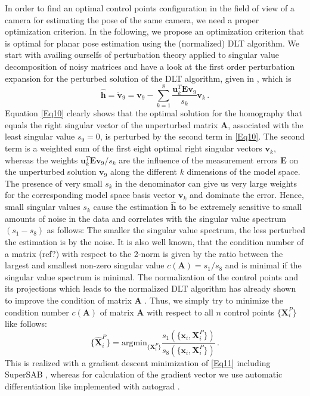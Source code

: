 \documentclass[letterpaper, 10 pt, conference]{ieeeconf}  %
\begin{document}
	In order to find an optimal control points configuration in the field of view of a camera for estimating the pose of the same camera, we need a proper optimization criterion. 
	In the following, we propose an optimization criterion that is optimal for planar pose estimation using the (normalized) DLT algorithm.
	We start with availing ourselfs of perturbation theory applied to singular value decomposition of noisy matrices \cite{Stewart1998} and have a look at the first order perturbation expansion for the
	perturbed solution of the DLT algorithm, given in \cite{Chen2009}, which is 
	\begin{equation}
	\label{Eq10}
	\hat{\mathbf{h}}=\tilde{\mathbf{v}}_9 = \mathbf{v}_9 - \sum\limits_{k=1}^8 \frac{\mathbf{u}_k^T\mathbf{E}\mathbf{v}_9}{s_k} \mathbf{v}_k\,.
	\end{equation}
	Equation \eqref{Eq10} clearly shows that the optimal solution for the homography that equals the 
	right singular vector of the unperturbed matrix $\mathbf{A}$, associated with the least singular value 
	$s_9 = 0$, is perturbed by the second term in \eqref{Eq10}. The second term is a weighted sum of the first eight optimal right singular vectors $\mathbf{v}_k$, whereas the weights $\mathbf{u}_k^T\mathbf{E}\mathbf{v}_9/ s_k$ are the influence of the measurement errors $\mathbf{E}$
	on the unperturbed solution $\mathbf{v}_9$ along the different $k$ dimensions of the model space.
	The presence of very small $s_k$ in the denominator can give us very large weights for the corresponding model space basis vector $\mathbf{v}_k$ and dominate the error. Hence, small singular values $s_k$ cause
	the estimation $\hat{\mathbf{h}}$ to be extremely sensitive to small amounts of noise in the data and correlates with the singular value spectrum $(s_1-s_8)$ as follows: The smaller the singular value spectrum, the less perturbed the estimation is by the noise. It is also well known, that the condition number of a matrix (ref?) with respect to the 2-norm is given by the ratio between the largest and smallest non-zero singular value $c(\mathbf{A}) = s_1/s_8$ and is minimal if the singular value spectrum is minimal.
	The normalization of the control points and its projections which leads to the normalized DLT algorithm
	has already shown to improve the condition of matrix $\mathbf{A}$ \cite{Hartley-97c}.
	Thus, we simply try to minimize the condition number $c(\mathbf{A})$ of matrix $\mathbf{A}$
	with respect to all $n$ control points $\{\mathbf{X}_i^P\}$ like follows:
	\begin{equation}
	\label{Eq11}
	\{\hat{\mathbf{X}}_i^P\} = \text{argmin}_{\{\mathbf{X}_i^P\}} 
	\frac{s_1(\{\mathbf{x}_i, \mathbf{X}_i^P\})}{s_8(\{\mathbf{x}_i, \mathbf{X}_i^P\})} \,.
	\end{equation}
	This is realized with a gradient descent minimization of \eqref{Eq11} including SuperSAB \cite{},
	whereas for calculation of the gradient vector we use
	automatic differentiation \cite{} like implemented with autograd \cite{}. 
	
\end{document}
